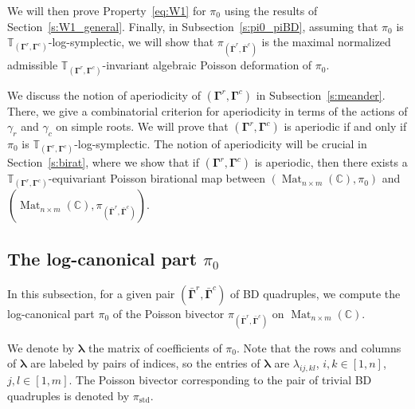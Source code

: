 \documentclass[11pt]{article}
\newcommand{\blambda}{\boldsymbol{\lambda}}
\newcommand{\bbg}{\bar{\mathbf{\Gamma}}}
\newcommand{\bg}{\mathbf{\Gamma}}
\newcommand{\std}{\mathrm{std}}
\DeclareMathOperator{\Mat}{Mat}
\theoremstyle{definition}\newtheorem{definition}[theorem]{Definition}
\theoremstyle{definition}\newtheorem{remark}[theorem]{Remark}
\theoremstyle{remark}
\numberwithin{equation}{section}
\begin{document}
We will then prove Property~\eqref{eq:W1} for $\pi_0$ using the results of Section~\ref{s:W1_general}. Finally, in Subsection~\ref{s:pi0_piBD}, assuming that $\pi_0$ is $\mathbb{T}_{(\bg^r,\bg^c)}$-log-symplectic, we will show that $\pi_{(\bbg^r,\bbg^c)}$ is the maximal normalized admissible $\mathbb{T}_{(\bg^r,\bg^c)}$-invariant algebraic Poisson deformation of $\pi_0$.

We discuss the notion of aperiodicity of $(\bg^r,\bg^c)$ in Subsection~\ref{s:meander}. There, we give a combinatorial criterion for aperiodicity in terms of the actions of $\gamma_r$ and $\gamma_c$ on simple roots. We will prove that $(\bg^r,\bg^c)$ is aperiodic if and only if $\pi_0$ is $\mathbb{T}_{(\bg^r,\bg^c)}$-log-symplectic. The notion of aperiodicity will be crucial in Section~\ref{s:birat}, where we show that if $(\bg^r,\bg^c)$ is aperiodic, then there exists a $\mathbb{T}_{(\bg^r,\bg^c)}$-equivariant Poisson birational map between $(\Mat_{n\times m}(\mathbb{C}),\pi_0)$ and $(\Mat_{n\times m}(\mathbb{C}),\pi_{(\bbg^r,\bbg^c)})$.

\subsection{\texorpdfstring{The log-canonical part $\pi_0$}{The log-canonical part}}
In this subsection, for a given pair $(\bbg^r,\bbg^c)$ of BD quadruples, we compute the log-canonical part $\pi_0$ of the Poisson bivector $\pi_{(\bbg^r,\bbg^c)}$ on $\Mat_{n\times m}(\mathbb{C})$.

We denote by $\blambda$ the matrix of coefficients of $\pi_0$. Note that the rows and columns of $\blambda$ are labeled by pairs of indices, so the entries of $\blambda$ are $\lambda_{ij,kl}$, $i,k \in [1,n]$, $j,l \in [1,m]$. The Poisson bivector corresponding to the pair of trivial BD quadruples is denoted by $\pi_{\std}$.
\end{document}
